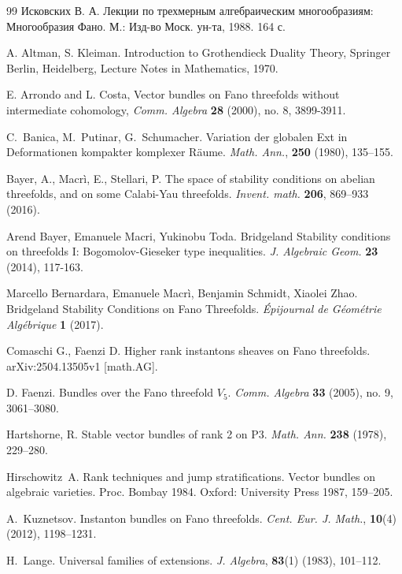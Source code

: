 \documentclass{amsart}
\begin{document}
	\begin{thebibliography}{99}
		Исковских В. А. Лекции по трехмерным алгебраическим многообразиям: Многообразия Фано. М.: Изд-во Моск. ун-та, 1988. 164 с.

		
		A. Altman, S. Kleiman. Introduction to Grothendieck Duality Theory, Springer Berlin,
		Heidelberg, Lecture Notes in Mathematics, 1970.
		
		E. Arrondo and L. Costa, Vector bundles on Fano threefolds without intermediate cohomology, \textit{Comm. Algebra} \textbf{28} (2000), no. 8, 3899-3911.
		
		C.~Banica, M.~Putinar, G.~Schumacher. Variation der globalen Ext in 
		Deformationen kompakter komplexer R\"{a}ume. \textit{Math. Ann.}, {\bf250} (1980), 
		135--155.
		
		Bayer, A., Macrì, E., Stellari, P. The space of stability conditions on abelian threefolds, and on some Calabi-Yau threefolds. \textit{Invent. math.} \textbf{206}, 869–933 (2016).
		
		Arend Bayer, Emanuele Macri, Yukinobu Toda. Bridgeland Stability conditions on threefolds I: Bogomolov-Gieseker type inequalities. \textit{J. Algebraic Geom.} \textbf{23} (2014), 117-163.
		
		Marcello Bernardara, Emanuele Macrì, Benjamin Schmidt, Xiaolei Zhao. Bridgeland Stability Conditions on Fano Threefolds. \textit{Épijournal de Géométrie Algébrique} \textbf{1} (2017).
		
		Comaschi G., Faenzi D. Higher rank instantons sheaves on Fano threefolds. arXiv:2504.13505v1 [math.AG].
		
		D. Faenzi. Bundles over the Fano threefold $V_5$. \textit{Comm. Algebra} \textbf{33} (2005), no. 9, 3061–3080.
		
		Hartshorne, R. Stable vector bundles of rank 2 on P3. \textit{Math. Ann.} \textbf{238} (1978), 229–280.
		
		Hirschowitz~A. Rank techniques and jump stratifications. Vector bundles on algebraic varieties. Proc. Bombay 1984. Oxford: University Press 1987, 159--205.
		
		A.~Kuznetsov. Instanton bundles on Fano threefolds. \textit{Cent. Eur. J. Math.}, {\bf10}(4) (2012), 1198--1231.
		
		H.~Lange. Universal families of extensions. \textit{J. Algebra}, {\bf83}(1) 
		(1983), 101--112.
		

\end{thebibliography}
\end{document}
